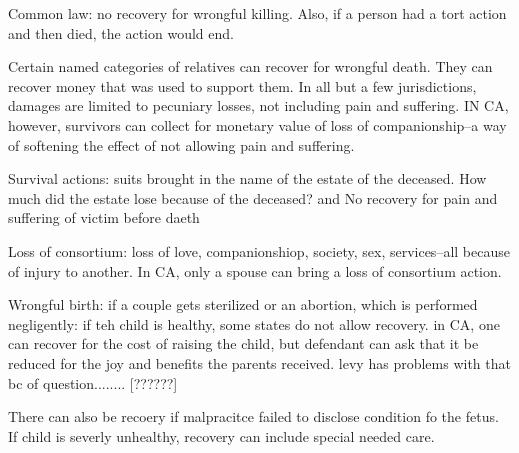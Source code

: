 %
%
%
%
%
    \item Common law: no recovery for wrongful killing. Also, if a person had a tort action and then died, the action would end.
    \item Certain named categories of relatives can recover for wrongful death. They can recover money that was used to support them. In all but a few jurisdictions, damages are limited to pecuniary losses, not including pain and suffering. IN CA, however, survivors can collect for monetary value of loss of companionship--a way of softening the effect of not allowing pain and suffering.
    \item Survival actions: suits brought in the name of the estate of the deceased. How much did the estate lose because of the deceased? and No recovery for pain and suffering of victim before daeth
    \item Loss of consortium: loss of love, companionshiop, society, sex, services--all because of injury to another. In CA, only a spouse can bring a loss of consortium action.
    \item Wrongful birth: if a couple gets sterilized or an abortion, which is performed negligently: if teh child is healthy, some states do not allow recovery. in CA, one can recover for the cost of raising the child, but defendant can ask that it be reduced for the joy and benefits the parents received. levy has problems with that bc of question........ [??????]
    \item There can also be recoery if malpracitce failed to disclose condition fo the fetus. If child is severly unhealthy, recovery can include special needed care.
